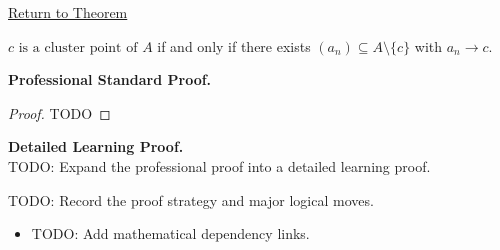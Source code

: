 \newpage
{}
\label{prf:cluster-point-sequential}

\begin{remark*}[Return]
\hyperref[thm:cluster-point-sequential]{Return to Theorem}
\end{remark*}

\begin{theorem*}
$c\text{ is a cluster point of }A$ if and only if there exists $(a_n) \subseteq A \setminus \{c\}$ with $a_n \to c$.
\end{theorem*}

\textbf{Professional Standard Proof.}~\\
\begin{proof}
TODO
\end{proof}

\textbf{Detailed Learning Proof.}~\\
TODO: Expand the professional proof into a detailed learning proof.

\begin{remark*}
TODO: Record the proof strategy and major logical moves.
\end{remark*}

\begin{dependencies}
\begin{itemize}
  \item TODO: Add mathematical dependency links.
\end{itemize}
\end{dependencies}
